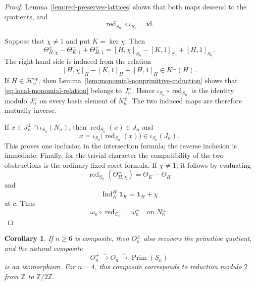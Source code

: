 \documentclass[a4paper,11pt]{article}
\numberwithin{equation}{section}
\newtheorem{corollary}[theorem]{Corollary}
\newcommand{\Z}{\mathbb{Z}}
\newcommand{\Ind}{\operatorname{Ind}}
\newcommand{\Prim}{\operatorname{Prim}}
\newcommand{\red}{\operatorname{red}}
\newcommand{\one}{\mathbf{1}}
\begin{document}
\begin{proof}
Lemma~\ref{lem:red-preserves-lattices} shows that both maps descend to the
quotients, and
\[
  \red_{S_n}\circ\iota_{S_n}=\mathrm{id}.
\]

Suppose that $\chi\ne1$ and put $K=\ker\chi$. Then
\begin{equation}\label{eq:local-monomial-relation}
  \Theta_{H,\chi}^{\pm}
  -\Theta_{K,1}^{\pm}
  +\Theta_{H,1}^{\pm}
  =
  [H,\chi]_{S_n}-[K,1]_{S_n}+[H,1]_{S_n}.
\end{equation}
The right-hand side is induced from the relation
\[
  [H,\chi]_H-[K,1]_H+[H,1]_H\in K^{\pm}(H).
\]
If $H\in\mathcal H_n^{\mathrm{np}}$, then
Lemma~\ref{lem:monomial-nonprimitive-induction} shows that
\eqref{eq:local-monomial-relation} belongs to $J_n^{\pm}$. Hence
$\iota_{S_n}\circ\red_{S_n}$ is the identity modulo $J_n^{\pm}$ on every
basis element of $N_n^{\pm}$. The two induced maps are therefore
mutually inverse.

If $x\in J_n^{\pm}\cap\iota_{S_n}(N_n)$, then
$\red_{S_n}(x)\in J_n$ and
\[
  x=\iota_{S_n}\bigl(\red_{S_n}(x)\bigr)\in\iota_{S_n}(J_n).
\]
This proves one inclusion in the intersection formula; the reverse inclusion
is immediate. Finally, for the trivial character the compatibility of the two
obstructions is the ordinary fixed-coset formula. If $\chi\ne1$, it follows by
evaluating
\[
  \red_{S_n}(\Theta_{H,\chi}^{\pm})=\Theta_K-\Theta_H
\]
and
\[
  \Ind_K^H\one_K=\one_H+\chi
\]
at $c$. Thus
\[
  \omega_n\circ\red_{S_n}=\omega_n^{\pm}
  \quad\text{on }N_n^{\pm}.
\]
\end{proof}

\begin{corollary}
If $n\ge6$ is composite, then $O_n^{\pm}$ also recovers the primitive
quotient, and the natural composite
\[
  O_n^{\pm}\xrightarrow{\sim}O_n\xrightarrow{\sim}\Prim(S_n)
\]
is an isomorphism. For $n=4$, this composite corresponds to reduction modulo
$2$ from $\Z$ to $\Z/2\Z$.
\end{corollary}
\end{document}
